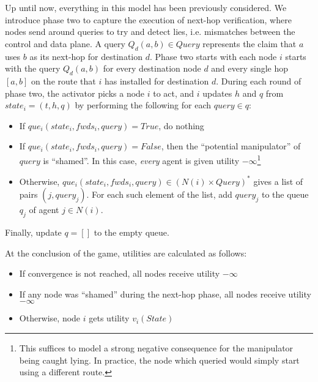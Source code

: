 \documentclass[12pt]{article}
\begin{document}
  Up until now, everything in this model has been previously considered.
  We introduce phase two to capture the execution of next-hop verification,
  where nodes send around queries to try and detect lies,
  i.e. mismatches between the control and data plane.
  A query $Q_d(a,b) \in Query$ represents the claim that $a$ uses $b$ as
  its next-hop for destination $d$.
  Phase two starts
  with each node $i$ starts with the query $Q_d(a,b)$ for every
  destination node $d$ and every single hop $[a,b]$ on the route
  that $i$ has installed for destination $d$.
  During each round of phase two, the activator picks a node $i$ to act,
  and $i$ updates $h$ and $q$ from $state_i=(t,h,q)$ by performing the following
  for each $query \in q$:
  \begin{itemize}
    \item If $que_i(state_i, fwds_i, query) = True$, do nothing
    \item If $que_i(state_i, fwds_i, query) = False$, then the
      ``potential manipulator'' of $query$ is ``shamed''.
      In this case, \emph{every} agent is given utility $-\infty$\footnote{
        This suffices to model a strong negative consequence for the manipulator
        being caught lying. In practice, the node which queried would simply start
        using a different route.
      }
    \item Otherwise, $que_i(state_i, fwds_i, query) \in (N(i)\times Query)^*$
      gives a list of pairs $(j, query_j)$.
      For each such element of the list, add $query_j$ to the queue $q_j$
      of agent $j\in N(i)$.
  \end{itemize}
  Finally, update $q = []$ to the empty queue.

  At the conclusion of the game, utilities are calculated as follows:
  \begin{itemize}
    \item If convergence is not reached, all nodes receive utility $-\infty$
    \item If any node was ``shamed'' during the next-hop phase,
      all nodes receive utility $-\infty$
    \item Otherwise, node $i$ gets utility $v_i(State)$
  \end{itemize}
\end{document}
